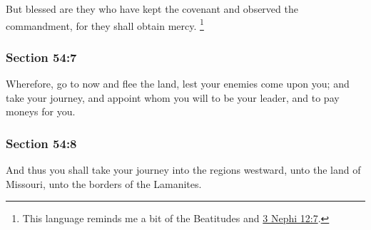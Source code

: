 		But blessed are they who have kept the covenant and observed the commandment, for they shall obtain mercy.%
			\footnote{%
				This language reminds me a bit of the Beatitudes and \hyperref[3NEPHI-12-7]{3 Nephi 12:7}.
				}


	\subsubsection{Section 54:7} %
		\label{DC54-7}

		Wherefore, go to now and flee the land, lest your enemies come upon you; and take your journey, and appoint whom you will to be your leader, and to pay moneys for you.


	\subsubsection{Section 54:8} %
		\label{DC54-8}

		And thus you shall take your journey into the regions westward, unto the land of Missouri, unto the borders of the Lamanites.


